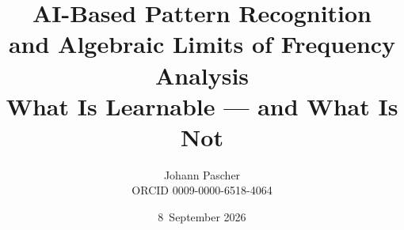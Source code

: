 \documentclass[11pt,a4paper]{report}
\title{AI-Based Pattern Recognition\\and Algebraic Limits of Frequency Analysis\\[0.5em]
  \large What Is Learnable --- and What Is Not}
\date{8~September 2026}
\author{Johann Pascher\\\small ORCID 0009-0000-6518-4064}
\begin{document}
\renewcommand{\thechapter}{}
\renewcommand{\thesection}{\arabic{section}}
\maketitle
\tableofcontents

\end{document}
